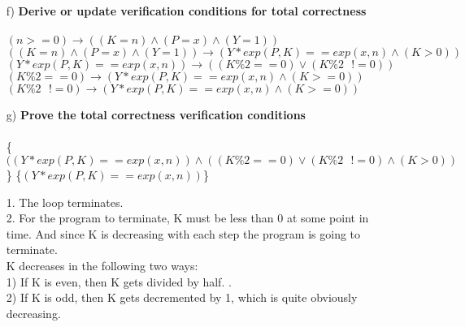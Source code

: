 \documentclass[a4paper]{article}
\begin{document}
\begin{itemize}
\begin{lstlisting}
    1:  K := n
    2:  P := x
    3:  Y := 1
    4:  WHILE (K > 0) DO
    (* \textit{ \{(Y $ * $ exp(P,K) == exp(x,n)) $ \land $ ((( K \% 2 = 0 ) $ \lor $ (K \% 2 != 0)) $ \land $ (K >= 0))\}} *)
    5:  IF (K % 2 = 0) THEN
    6:  P := P * P
    7:  K := K / 2
    8:  ELSE
    9:  Y := Y * P
    10: K := K - 1
    11: FI
    12: OD
    \end{lstlisting}
    postcondition\{ $ Y * exp(P,K) == exp(x,n) \land (K >= 0) $ \}
    \item[f)] \textbf{Derive or update verification conditions for total correctness} \\\\
    $ (n >= 0) \rightarrow ((K = n) \land (P = x) \land (Y = 1)) $\\
    $ ((K = n) \land (P = x) \land (Y = 1)) \rightarrow (Y * exp(P,K) == exp(x,n) \land (K > 0)) $\\
    $ (Y * exp(P,K) == exp(x,n)) \rightarrow ((K \% 2 == 0) \lor (K \% 2 \text{ } != 0)) $\\
    $ (K \% 2 == 0) \rightarrow (Y * exp(P,K) == exp(x,n) \land (K >= 0)) $\\
    $ (K \% 2 \text{ } != 0) \rightarrow (Y* exp(P,K) == exp(x,n) \land (K >= 0)) $
    \item[g)] \textbf{Prove the total correctness verification conditions} \\\\
    \{$ ((Y * exp(P,K) == exp(x,n)) \land (( K \% 2 == 0 ) \lor (K \% 2 \text{ } != 0) \land (K > 0)) $\} \{$ (Y * exp(P,K) == exp(x,n)) $\}
    
    1. The loop terminates. \\ 
    2. For the program to terminate, K must be less than 0 at some point in time. And since K is decreasing with each step the program is going to terminate. \\ 
    K decreases in the following two ways: \\
    1) If K is even, then K gets divided by half. .\\
    2) If K is odd, then K gets decremented by 1, which is quite obviously decreasing. 
\end{itemize}
\end{document}
